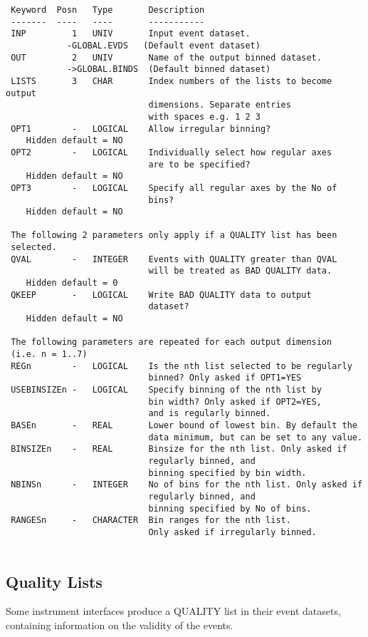 \documentclass{book}
\renewcommand{\_}{{\tt\char'137}}     %
\begin{document}
\begin{verbatim}
 Keyword  Posn   Type       Description
 -------  ----   ----       -----------
 INP         1   UNIV       Input event dataset.
            -GLOBAL.EVDS   (Default event dataset)
 OUT         2   UNIV       Name of the output binned dataset.
            ->GLOBAL.BINDS  (Default binned dataset)
 LISTS       3   CHAR       Index numbers of the lists to become output
                            dimensions. Separate entries
                            with spaces e.g. 1 2 3
 OPT1        -   LOGICAL    Allow irregular binning?
    Hidden default = NO
 OPT2        -   LOGICAL    Individually select how regular axes
                            are to be specified?
    Hidden default = NO
 OPT3        -   LOGICAL    Specify all regular axes by the No of
                            bins?
    Hidden default = NO
 
 The following 2 parameters only apply if a QUALITY list has been
 selected.
 QVAL        -   INTEGER    Events with QUALITY greater than QVAL
                            will be treated as BAD QUALITY data.
    Hidden default = 0
 QKEEP       -   LOGICAL    Write BAD QUALITY data to output
                            dataset?
    Hidden default = NO
 
 The following parameters are repeated for each output dimension
 (i.e. n = 1..7)
 REGn        -   LOGICAL    Is the nth list selected to be regularly
                            binned? Only asked if OPT1=YES
 USEBINSIZEn -   LOGICAL    Specify binning of the nth list by
                            bin width? Only asked if OPT2=YES,
                            and is regularly binned.
 BASEn       -   REAL       Lower bound of lowest bin. By default the
                            data minimum, but can be set to any value.
 BINSIZEn    -   REAL       Binsize for the nth list. Only asked if
                            regularly binned, and
                            binning specified by bin width.
 NBINSn      -   INTEGER    No of bins for the nth list. Only asked if
                            regularly binned, and
                            binning specified by No of bins.
 RANGESn     -   CHARACTER  Bin ranges for the nth list.
                            Only asked if irregularly binned.
 
\end{verbatim}\subsection{Quality Lists}
Some instrument interfaces produce a QUALITY list in their event
datasets, containing information on the validity of the events.
 
\end{document}
